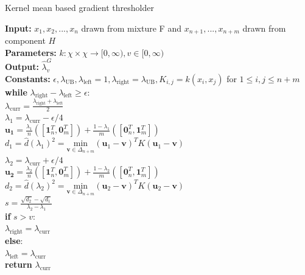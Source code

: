 \documentclass[lineno]{biometrika}
\begin{document}
\begin{algorithm}[!h]
\caption{Kernel mean based gradient thresholder}
\begin{tabbing}
\qquad \enspace \textbf{Input:} $x_1,x_2,...,x_n$ drawn from mixture F and $x_{n+1},...,x_{n+m}$ drawn from component $H$\\
\qquad \enspace \textbf{Parameters:} $k : \chi \times \chi \to [0,\infty),  v \in [0,\infty) $\\
\qquad  \enspace \textbf{Output:} $\hat{\lambda}^G_v$\\
\qquad \enspace \textbf{Constants:} $\epsilon, \lambda_{\textrm{UB}}, \lambda_{\textrm{left}} = 1, \lambda_{\textrm{right}} = \lambda_{\textrm{UB}}, K_{i,j} = k(x_i,x_j)$ for $1 \le i, j \le n + m$ \\
\qquad \enspace \textbf{while} $\lambda_{\textrm{right}} - \lambda_{\textrm{left}} \ge \epsilon:$ \\
\qquad \qquad \enspace $\lambda_{\textrm{curr}} = \frac{\lambda_{\textrm{right}} + \lambda_{\textrm{left}}}{2} $ \\
\qquad \qquad \enspace $\lambda_1 = \lambda_{\textrm{curr}}- \epsilon / 4 $ \\
\qquad \qquad \enspace $\mathbf{u_1}  = \frac{\lambda_1}{n} ([\mathbf{1}_n^T, \mathbf{0}_m^T]) + \frac{1-\lambda_1}{m} ([\mathbf{0}_n^T, \mathbf{1}_m^T])$ \\
\qquad \qquad \enspace $d_1 = \hat{d}(\lambda_1)^2 = \underset{\mathbf{v}\in\Delta_{n+m}}{\textrm{min}} (\mathbf{u}_1 - \mathbf{v})^T K (\mathbf{u}_1 - \mathbf{v}) $ \\
\qquad \qquad \enspace $\lambda_2 = \lambda_{\textrm{curr}} + \epsilon / 4 $ \\
\qquad \qquad \enspace $\mathbf{u_2}  = \frac{\lambda_2}{n} ([\mathbf{1}_n^T, \mathbf{0}_m^T]) + \frac{1-\lambda_2}{m} ([\mathbf{0}_n^T, \mathbf{1}_m^T])$ \\
\qquad \qquad \enspace $d_2 = \hat{d}(\lambda_2)^2 = \underset{\mathbf{v}\in\Delta_{n+m}}{\textrm{min}} (\mathbf{u}_2 - \mathbf{v})^T K (\mathbf{u}_2 - \mathbf{v}) $ \\
\qquad \qquad \enspace $s = \frac{\sqrt{d_2} - \sqrt{d_1}}{\lambda_2 - \lambda_1} $ \\
\qquad \qquad \enspace \textbf{if} $s > v$: \\
\qquad \qquad \qquad \enspace $\lambda_{\textrm{right}} = \lambda_{\textrm{curr}} $ \\
\qquad \qquad \enspace \textbf{else}: \\
\qquad \qquad \qquad \enspace $\lambda_{\textrm{left}} = \lambda_{\textrm{curr}} $ \\
\qquad \enspace \textbf{return} $\lambda_{\textrm{curr}}$
\end{tabbing}
\end{algorithm}
\end{document}
